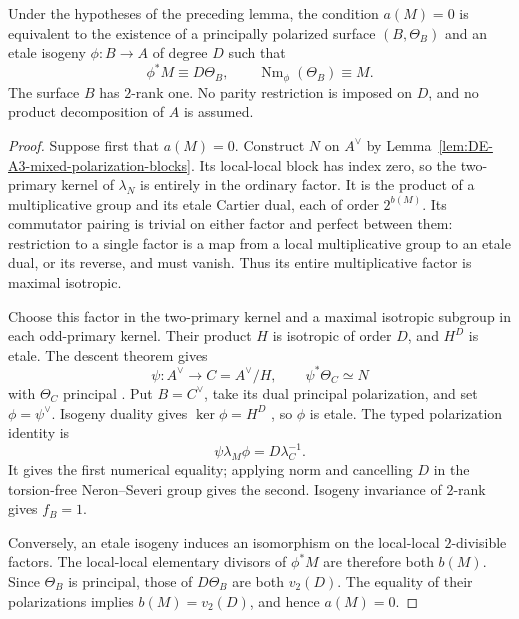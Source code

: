 \begin{lemma}
\label{lem:DE-A3-mixed-index-zero-source}
Under the hypotheses of the preceding lemma, the condition $a(M)=0$
is equivalent to the existence of a principally polarized surface
$(B,\Theta_B)$ and an etale isogeny $\phi:B\to A$ of degree $D$
such that
\[
                \phi^*M\equiv D\Theta_B,\qquad
                \operatorname{Nm}_\phi(\Theta_B)\equiv M.
\]
The surface $B$ has $2$-rank one.  No parity restriction is imposed
on $D$, and no product decomposition of $A$ is assumed.
\end{lemma}
\begin{proof}
Suppose first that $a(M)=0$.  Construct $N$ on $A^\vee$ by
Lemma~\ref{lem:DE-A3-mixed-polarization-blocks}.
Its local-local block has index zero, so the two-primary kernel of
$\lambda_N$ is entirely in the ordinary factor.  It is the product
of a multiplicative group and its etale Cartier dual, each of order
$2^{b(M)}$.  Its commutator pairing is trivial on either factor and
perfect between them: restriction to a single factor is a map from
a local multiplicative group to an etale dual, or its reverse, and
must vanish.  Thus its entire multiplicative factor is maximal
isotropic.

Choose this factor in the two-primary kernel and a maximal isotropic
subgroup in each odd-primary kernel.  Their product $H$ is isotropic
of order $D$, and $H^D$ is etale.  The descent theorem gives
\[
       \psi:A^\vee\longrightarrow C=A^\vee/H,\qquad
       \psi^*\Theta_C\simeq N
\]
with $\Theta_C$ principal
\cite[Proposition~8.19 and proof, p.~119]
{EdixhovenVanDerGeerMoonenAV}.
Put $B=C^\vee$, take its dual principal polarization, and set
$\phi=\psi^\vee$.  Isogeny duality gives
$\ker\phi=H^D$ \cite[Theorem~7.5, p.~100]
{EdixhovenVanDerGeerMoonenAV}, so $\phi$ is etale.
The typed polarization identity is
\[
                       \psi\lambda_M\phi=D\lambda_C^{-1}.
\]
It gives the first numerical equality; applying norm and cancelling
$D$ in the torsion-free Neron--Severi group gives the second.
Isogeny invariance of $2$-rank gives $f_B=1$.

Conversely, an etale isogeny induces an isomorphism on the
local-local $2$-divisible factors.  The local-local elementary
divisors of $\phi^*M$ are therefore both $b(M)$.  Since $\Theta_B$
is principal, those of $D\Theta_B$ are both $v_2(D)$.
The equality of their polarizations implies $b(M)=v_2(D)$,
and hence $a(M)=0$.
\end{proof}

